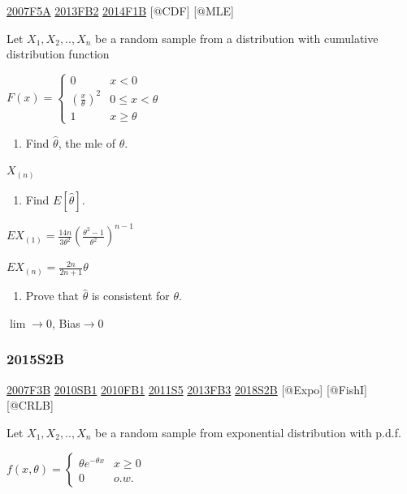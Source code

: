 \documentclass[6pt,twocolumn,Portrait]{article}
\providecommand{\tightlist}{%
  \setlength{\itemsep}{0pt}\setlength{\parskip}{0pt}}
\begin{document}
\protect\hyperlink{f5a}{2007F5A} \protect\hyperlink{fb2-2}{2013FB2}
\protect\hyperlink{f1b-1}{2014F1B} {[}@CDF{]} {[}@MLE{]}

Let \(X_1,X_2,..,X_n\) be a random sample from a distribution with
cumulative distribution function

\(F(x)=\begin{cases}0&x<0\\(\frac{x}\theta)^2& 0\le x<\theta\\1& x\ge\theta\end{cases}\)

\begin{enumerate}
\def\labelenumi{(\alph{enumi})}
\tightlist
\item
  Find \(\hat\theta\), the mle of \(\theta\).
\end{enumerate}

\(X_{(n)}\)

\begin{enumerate}
\def\labelenumi{(\alph{enumi})}
\setcounter{enumi}{1}
\tightlist
\item
  Find \(E[\hat\theta]\).
\end{enumerate}

\(EX_{(1)}=\frac{14n}{3\theta^2}(\frac{\theta^2-1}{\theta^2})^{n-1}\)

\(EX_{(n)}=\frac{2n}{2n+1}\theta\)

\begin{enumerate}
\def\labelenumi{(\alph{enumi})}
\setcounter{enumi}{2}
\tightlist
\item
  Prove that \(\hat\theta\) is consistent for \(\theta\).
\end{enumerate}

\(\lim\to0\), Bias\(\to0\)

\hypertarget{s2b-1}{%
\subsubsection{2015S2B}\label{s2b-1}}

\protect\hyperlink{f3b}{2007F3B} \protect\hyperlink{sb1-1}{2010SB1}
\protect\hyperlink{fb1-1}{2010FB1} \protect\hyperlink{s5-2}{2011S5}
\protect\hyperlink{fb3-2}{2013FB3} \protect\hyperlink{s2b-2}{2018S2B}
{[}@Expo{]} {[}@FishI{]} {[}@CRLB{]}

Let \(X_1,X_2,..,X_n\) be a random sample from exponential distribution
with p.d.f.

\(f(x,\theta)=\begin{cases}\theta e^{-\theta x}& x\ge0\\0& o.w.\end{cases}\)
\end{document}

